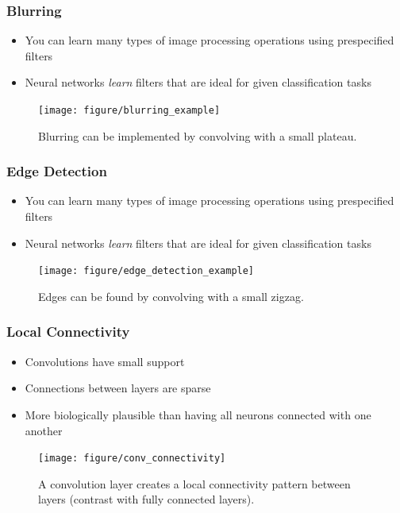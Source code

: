 \documentclass[10pt,mathserif]{beamer}
\begin{document}
\begin{frame}
  \frametitle{Blurring}
  \begin{itemize}
    \item You can learn many types of image processing operations using
      prespecified filters
    \item Neural networks \textit{learn} filters that are ideal for given
      classification tasks
  \end{itemize}
  \begin{figure}[ht]
    \centering
    \texttt{[image: figure/blurring\_example]}
    \caption{Blurring can be implemented by convolving with a small
      plateau. \label{fig:blurring_example} }
  \end{figure}
\end{frame}

\begin{frame}
  \frametitle{Edge Detection}
  \begin{itemize}
    \item You can learn many types of image processing operations using
      prespecified filters
    \item Neural networks \textit{learn} filters that are ideal for given
      classification tasks
  \end{itemize}
  \begin{figure}[ht]
    \centering
    \texttt{[image: figure/edge\_detection\_example]}
    \caption{Edges can be found by convolving with a small
      zigzag. \label{fig:edges_example} }
  \end{figure}
\end{frame}

\begin{frame}
  \frametitle{Local Connectivity}
  \begin{itemize}
  \item Convolutions have small support
  \item Connections between layers are sparse
  \item More biologically plausible than having all neurons connected with one
    another
  \end{itemize}
  \begin{figure}[ht]
    \centering
    \texttt{[image: figure/conv\_connectivity]}
    \caption{A convolution layer creates a local connectivity pattern between
      layers (contrast with fully connected
      layers). \label{fig:conv_connectivity} }
  \end{figure}
\end{frame}
\end{document}
